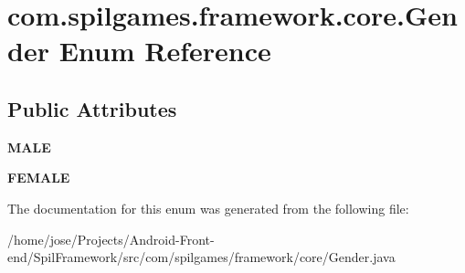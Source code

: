 \hypertarget{enumcom_1_1spilgames_1_1framework_1_1core_1_1_gender}{\section{com.\-spilgames.\-framework.\-core.\-Gender Enum Reference}
\label{enumcom_1_1spilgames_1_1framework_1_1core_1_1_gender}
}
\subsection*{Public Attributes}
\begin{DoxyCompactItemize}
\item 
\hypertarget{enumcom_1_1spilgames_1_1framework_1_1core_1_1_gender_a73ec722c451b28a79b49e2c67f3bc92e}{{\bfseries M\-A\-L\-E}}\label{enumcom_1_1spilgames_1_1framework_1_1core_1_1_gender_a73ec722c451b28a79b49e2c67f3bc92e}

\item 
\hypertarget{enumcom_1_1spilgames_1_1framework_1_1core_1_1_gender_a4e47651595984c232374856bf0c38b2d}{{\bfseries F\-E\-M\-A\-L\-E}}\label{enumcom_1_1spilgames_1_1framework_1_1core_1_1_gender_a4e47651595984c232374856bf0c38b2d}

\end{DoxyCompactItemize}


The documentation for this enum was generated from the following file\-:\begin{DoxyCompactItemize}
\item 
/home/jose/\-Projects/\-Android-\/\-Front-\/end/\-Spil\-Framework/src/com/spilgames/framework/core/Gender.\-java\end{DoxyCompactItemize}
